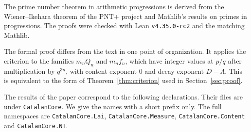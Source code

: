\documentclass[11pt]{amsart}
\theoremstyle{definition}
\theoremstyle{remark}
\numberwithin{equation}{section}
\newcommand{\lean}[1]{\nolinkurl{#1}}
\begin{document}
The prime number theorem in arithmetic progressions is derived from the Wiener--Ikehara theorem of the PNT+ project
\cite{PNTPlus} and Mathlib's results on primes in progressions. The proofs were checked with Lean
\texttt{v4.35.0-rc2} and the matching Mathlib.

The formal proof differs from the text in one point of organization. It applies the criterion to the families
$m_nQ_n$ and $m_nf_n$, which have integer values at $p/q$ after multiplication by $q^{3n}$, with content exponent $0$
and decay exponent $D-\Lambda$. This is equivalent to the form of Theorem~\ref{thm:criterion} used in
Section~\ref{sec:proof}.

The results of the paper correspond to the following declarations. Their files are under \lean{CatalanCore}. We give
the names with a short prefix only. The full namespaces are \lean{CatalanCore.Lai}, \lean{CatalanCore.Measure},
\lean{CatalanCore.Content} and \lean{CatalanCore.NT}.
\end{document}
